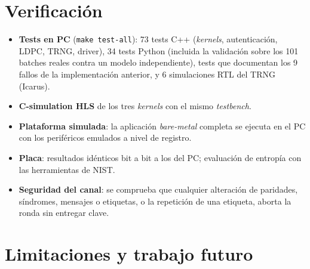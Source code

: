 \documentclass[a4paper,11pt]{article}
\newcommand{\code}[1]{\texttt{#1}}
\begin{document}
\section{Verificación}

\begin{itemize}
  \item \textbf{Tests en PC} (\code{make test-all}): 73 tests C++ (\emph{kernels}, autenticación, LDPC, TRNG, driver),
        34 tests Python (incluida la validación sobre los 101 batches reales contra un modelo independiente),
        tests que documentan los 9 fallos de la implementación anterior, y 6 simulaciones RTL del TRNG (Icarus).
  \item \textbf{C-simulation HLS} de los tres \emph{kernels} con el mismo \emph{testbench}.
  \item \textbf{Plataforma simulada}: la aplicación \emph{bare-metal} completa se ejecuta en el PC con los periféricos
        emulados a nivel de registro.
  \item \textbf{Placa}: resultados idénticos bit a bit a los del PC; evaluación de entropía con las herramientas de NIST.
  \item \textbf{Seguridad del canal}: se comprueba que cualquier alteración de paridades, síndromes, mensajes o
        etiquetas, o la repetición de una etiqueta, aborta la ronda sin entregar clave.
\end{itemize}

\section{Limitaciones y trabajo futuro}
\end{document}
